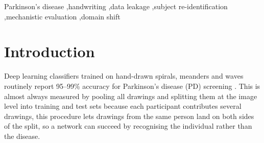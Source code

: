 \documentclass[3p,final,10pt]{elsarticle}
\let\oldsection\section
\renewcommand{\section}{\FloatBarrier\oldsection}
\begin{document}
\begin{frontmatter}
\begin{abstract}
geometric and trace-intrinsic, not background-confined or colour-related
suppressing the background/template channel specifically does not improve
honest-protocol accuracy, so that one class of preprocessing-only
de-leaking intervention is insufficient on this evidence. Cohort
decodability from the trace is correlational, not a causal attribution of
the cross-cohort AUC drop to any single mechanism population, disease-stage,
or protocol differences between cohorts remain equally compatible
explanations and are not ruled out here. We
recommend pairing any de-leaking intervention with a signal-localisation
probe run before and after, including a rendering-invariance control,
released as a reusable protocol.
\end{abstract}

\begin{keyword}
Parkinson's disease \sep handwriting \sep data leakage \sep subject re-identification \sep mechanistic evaluation \sep domain shift
\end{keyword}

\end{frontmatter}

\linenumbers

\section{Introduction}

Deep learning classifiers trained on hand-drawn spirals, meanders and waves
routinely report 95--99\% accuracy for Parkinson's disease (PD) screening
\cite{gazda2022,kamran2021}. This is almost always measured by pooling all
drawings and splitting them at the image level into training and test sets
because each participant contributes several drawings, this procedure lets
drawings from the same person land on both sides of the split, so a network
can succeed by recognising the individual rather than the disease.
\end{document}
